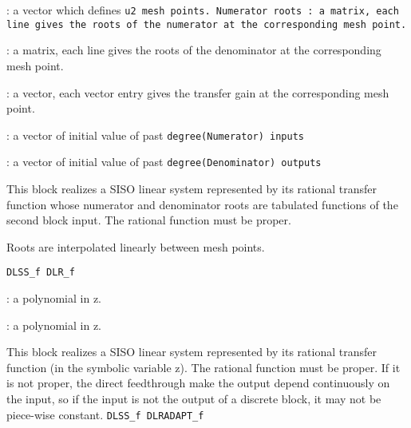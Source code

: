 \begin{scitem}
\item[{\verb?Vector of p mesh points?}]
: a vector which defines %
\tt u2 %
\rm mesh points.
Numerator roots
: a matrix, each line gives the roots of the numerator at the
corresponding mesh point.
\item[{\verb?Denominator roots?}]
: a matrix, each line gives the roots of the denominator at the
corresponding mesh point.
\item[{\verb?gain?}]
: a vector, each vector entry gives the transfer gain at the
corresponding mesh point.
\item[{\verb?past inputs?}]
: a vector of initial value of past %
\tt degree(Numerator) %
\rm inputs
\item[{\verb?past outputs?}]
: a vector of initial value of past %
\tt degree(Denominator) %
\rm outputs

\end{scitem}%
This block realizes a SISO linear system represented by its rational
transfer function whose numerator and denominator roots are tabulated
functions of the second block input. The rational function must be
proper.

Roots are interpolated linearly between mesh points.

{\verb?DLSS_f DLR_f?} \pageref{DLSSfDLRf}






%
%


\label{DLRf}


\begin{scitem}
\item[{\verb?Numerator?}]
: a polynomial in z.
\item[{\verb?Denomiator?}]
: a polynomial in z.
\end{scitem}%
This block realizes a SISO linear system represented by its rational
transfer function (in the symbolic variable z).
The rational function must be proper. If it is not proper, the
direct feedthrough make the output depend continuously on the input,
so if the input  
is not the output of a discrete block, it may not be piece-wise constant.
{\verb?DLSS_f DLRADAPT_f?} \pageref{DLSSfDLRADAPTf}






